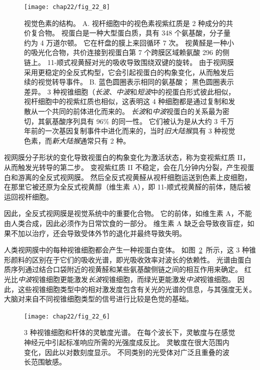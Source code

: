 \begin{figure}[htbp]
	\centering
	\texttt{[image: chap22/fig\_22\_8]}
	\caption{视觉色素的结构。
		A. 视杆细胞中的视色素视紫红质是 2 种成分的共价复合物。
		视蛋白是一种大型蛋白质，具有 348 个氨基酸，分子量约为 4 万道尔顿。
		它在杆盘的膜上来回循环 7 次。
		视黄醛是一种小的吸光化合物，共价连接到视蛋白第 7 个跨膜区域赖氨酸 296 的侧链上。
		11-顺式视黄醛对光的吸收导致围绕双键的旋转。
		由于视网膜采用更稳定的全反式构型，它会引起视蛋白的构象变化，从而触发后续的视觉转导事件\cite{nathans1984isolation}。
		B. 蓝色圆圈表示相同的氨基酸；
		黑色圆圈表示差异。
		3 种视锥细胞（\textit{长波}、\textit{中波}和\textit{短波}中的视蛋白形式彼此相似，视杆细胞中的视紫红质也相似，这表明这 4 种细胞都是通过复制和发散从一个共同的前体进化而来的。
		\textit{长波}和\textit{中波}视蛋白的关系最为密切，其氨基酸序列具有 96\% 的同一性。
		它们被认为是从大约 3 千万年前的一次基因复制事件中进化而来的，当时\textit{旧大陆猴}具有 3 种视觉色素，而\textit{新大陆猴}通常只有 2 种。}
	\label{fig:22_8}
\end{figure}


视网膜分子形状的变化导致视蛋白的构象变化为激活状态，称为变视紫红质 II，从而触发光转导的第二步。
变视紫红质 II 不稳定，会在几分钟内分裂，产生视蛋白和游离的全反式视网膜。
然后全反式视黄醛从视杆细胞运送到色素上皮细胞，在那里它被还原为全反式视黄醇（维生素 A），即 11-顺式视黄醛的前体，随后被运回视杆细胞。


因此，全反式视网膜是视觉系统中的重要化合物。
它的前体，如维生素 A，不能由人类合成，因此必须作为日常饮食的一部分。
维生素 A 缺乏会导致夜盲症，如果不加以治疗，还会导致受体外节的退化并最终导致失明。


人类视网膜中的每种视锥细胞都会产生一种视蛋白变体。 
如图~\ref{fig:22_6}~所示，这 3 种锥形颜料的区别在于它们的吸收光谱，即光吸收效率对波长的依赖性。
光谱由蛋白质序列通过结合口袋附近的视黄醛和某些氨基酸侧链之间的相互作用来确定。
红光比\textit{中波}视锥细胞更能激发\textit{长波}视锥细胞，而绿光更能激发\textit{中波}视锥细胞。
因此，这些视锥细胞类型中的相对激发度包含有关光的光谱的信息，与其强度无关。
大脑对来自不同视锥细胞类型的信号进行比较是色觉的基础。


\begin{figure}[htbp]
	\centering
	\texttt{[image: chap22/fig\_22\_6]}
	\caption{3 种视锥细胞和杆体的灵敏度光谱。
		在每个波长下，灵敏度与在感觉神经元中引起标准响应所需的光强度成反比。 
		灵敏度在很大范围内变化，因此以对数刻度显示。 
		不同类别的光受体对广泛且重叠的波长范围敏感。}
	\label{fig:22_6}
\end{figure}


